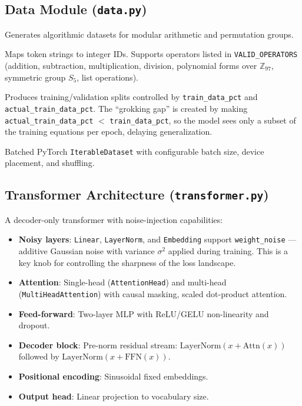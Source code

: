 \documentclass[11pt,a4paper]{article}
\theoremstyle{definition}
\begin{document}
\subsection{Data Module (\texttt{data.py})}

Generates algorithmic datasets for modular arithmetic and permutation groups.

\begin{description}[leftmargin=*]
    \item[\texttt{ArithmeticTokenizer}] Maps token strings to integer IDs. Supports operators
          listed in \texttt{VALID\_OPERATORS} (addition, subtraction, multiplication, division,
          polynomial forms over $\mathbb{Z}_{97}$, symmetric group $S_5$, list operations).
    \item[\texttt{ArithmeticDataset}] Produces training/validation splits controlled by
          \texttt{train\_data\_pct} and \texttt{actual\_train\_data\_pct}. The ``grokking gap''
          is created by making \texttt{actual\_train\_data\_pct} $<$ \texttt{train\_data\_pct},
          so the model sees only a subset of the training equations per epoch, delaying generalization.
    \item[\texttt{ArithmeticIterator}] Batched PyTorch \texttt{IterableDataset} with configurable
          batch size, device placement, and shuffling.
\end{description}

\subsection{Transformer Architecture (\texttt{transformer.py})}

A decoder-only transformer with noise-injection capabilities:

\begin{itemize}[leftmargin=*]
    \item \textbf{Noisy layers}: \texttt{Linear}, \texttt{LayerNorm}, and \texttt{Embedding} support
          \texttt{weight\_noise} --- additive Gaussian noise with variance $\sigma^2$ applied during
          training. This is a key knob for controlling the sharpness of the loss landscape.
    \item \textbf{Attention}: Single-head (\texttt{AttentionHead}) and multi-head
          (\texttt{MultiHeadAttention}) with causal masking, scaled dot-product attention.
    \item \textbf{Feed-forward}: Two-layer MLP with ReLU/GELU non-linearity and dropout.
    \item \textbf{Decoder block}: Pre-norm residual stream: $\text{LayerNorm}(x + \text{Attn}(x))$
          followed by $\text{LayerNorm}(x + \text{FFN}(x))$.
    \item \textbf{Positional encoding}: Sinusoidal fixed embeddings.
    \item \textbf{Output head}: Linear projection to vocabulary size.
\end{itemize}
\end{document}
